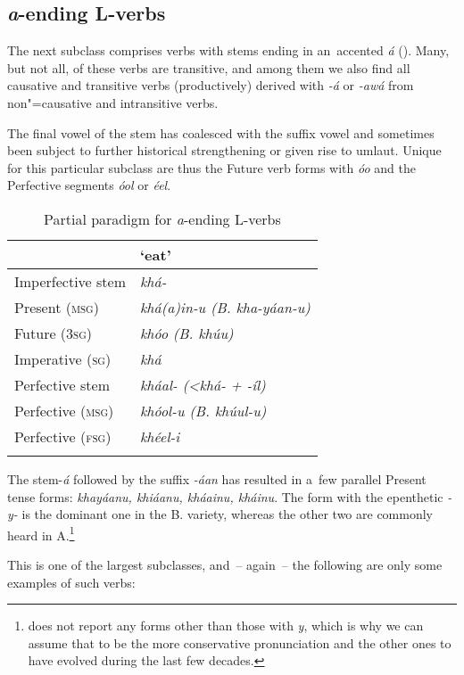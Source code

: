 \subsection{\textit{a}-ending L-verbs}
\label{subsec:8-3-2}


The next subclass comprises verbs with stems ending in an~accented \textit{á} (). Many, but not all, of these verbs are transitive, and among them we also find all causative and transitive verbs (productively) derived with \textit{-á} or \textit{-awá} from non"=causative and intransitive verbs.


The final vowel of the stem has coalesced with the suffix vowel and sometimes been subject to further historical strengthening or given rise to umlaut. Unique for this particular subclass are thus the Future verb forms with \textit{óo} and the Perfective segments \textit{óol} or \textit{éel}. 


\begin{table}[ht]
\caption{Partial paradigm for \textit{a}-ending L-verbs}
\begin{tabularx}{.75\textwidth}{ Q Q }
\lsptoprule
&
`eat'\\\hline
Imperfective stem &
\textit{khá-} \\
Present (\textsc{msg}) &
\textit{khá(a)in-u (B. kha-yáan-u)}\\
Future (\textsc{3sg}) &
\textit{khóo (B. khúu)}\\
Imperative (\textsc{sg}) &
\textit{khá} \\
Perfective stem &
\textit{kháal- ({\textless}khá- + -íl)}\\
Perfective (\textsc{msg}) &
\textit{khóol-u (B. khúul-u)}\\
Perfective (\textsc{fsg}) &
\textit{khéel-i} \\\lspbottomrule
\end{tabularx}
\label{tab:8-5}
\end{table}


The stem-\textit{á} followed by the suffix \textit{-áan} has resulted in a~few parallel Present tense forms: \textit{khayáanu, khiáanu, kháainu, kháinu}. The form with the epenthetic \textit{-y-} is the dominant one in the B. variety, whereas the other two are commonly heard in A.\footnote{\citet[22]{morgenstierne1941} does not report any forms other than those with \textit{y}, which is why we can assume that to be the more conservative pronunciation and the other ones to have evolved during the last few decades.} 


This is one of the largest subclasses, and~-- again~-- the following are only some examples of such verbs:


